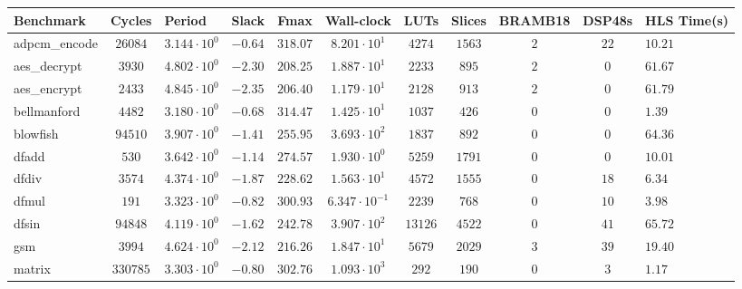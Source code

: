 \begin{tabular}{|l|c|HHc|c|c|c|c|cH|}
\hline
Benchmark     & Cycles       & Period                 & Slack     & Fmax       & Wall-clock              & LUTs      & Slices    & BRAMB18 & DSP48s  & HLS Time(s) \\
\hline
adpcm\_encode & $ 26084    $ & $ 3.144 \cdot 10^{0} $ & $ -0.64 $ & $ 318.07 $ & $ 8.201 \cdot 10^{1}  $ & $ 4274  $ & $ 1563  $ & $ 2   $ & $ 22  $ & $ 10.21   $ \\
aes\_decrypt  & $ 3930     $ & $ 4.802 \cdot 10^{0} $ & $ -2.30 $ & $ 208.25 $ & $ 1.887 \cdot 10^{1}  $ & $ 2233  $ & $ 895   $ & $ 2   $ & $ 0   $ & $ 61.67   $ \\
aes\_encrypt  & $ 2433     $ & $ 4.845 \cdot 10^{0} $ & $ -2.35 $ & $ 206.40 $ & $ 1.179 \cdot 10^{1}  $ & $ 2128  $ & $ 913   $ & $ 2   $ & $ 0   $ & $ 61.79   $ \\
bellmanford   & $ 4482     $ & $ 3.180 \cdot 10^{0} $ & $ -0.68 $ & $ 314.47 $ & $ 1.425 \cdot 10^{1}  $ & $ 1037  $ & $ 426   $ & $ 0   $ & $ 0   $ & $ 1.39    $ \\
blowfish      & $ 94510    $ & $ 3.907 \cdot 10^{0} $ & $ -1.41 $ & $ 255.95 $ & $ 3.693 \cdot 10^{2}  $ & $ 1837  $ & $ 892   $ & $ 0   $ & $ 0   $ & $ 64.36   $ \\
dfadd         & $ 530      $ & $ 3.642 \cdot 10^{0} $ & $ -1.14 $ & $ 274.57 $ & $ 1.930 \cdot 10^{0}  $ & $ 5259  $ & $ 1791  $ & $ 0   $ & $ 0   $ & $ 10.01   $ \\
dfdiv         & $ 3574     $ & $ 4.374 \cdot 10^{0} $ & $ -1.87 $ & $ 228.62 $ & $ 1.563 \cdot 10^{1}  $ & $ 4572  $ & $ 1555  $ & $ 0   $ & $ 18  $ & $ 6.34    $ \\
dfmul         & $ 191      $ & $ 3.323 \cdot 10^{0} $ & $ -0.82 $ & $ 300.93 $ & $ 6.347 \cdot 10^{-1} $ & $ 2239  $ & $ 768   $ & $ 0   $ & $ 10  $ & $ 3.98    $ \\
dfsin         & $ 94848    $ & $ 4.119 \cdot 10^{0} $ & $ -1.62 $ & $ 242.78 $ & $ 3.907 \cdot 10^{2}  $ & $ 13126 $ & $ 4522  $ & $ 0   $ & $ 41  $ & $ 65.72   $ \\
gsm           & $ 3994     $ & $ 4.624 \cdot 10^{0} $ & $ -2.12 $ & $ 216.26 $ & $ 1.847 \cdot 10^{1}  $ & $ 5679  $ & $ 2029  $ & $ 3   $ & $ 39  $ & $ 19.40   $ \\
matrix        & $ 330785   $ & $ 3.303 \cdot 10^{0} $ & $ -0.80 $ & $ 302.76 $ & $ 1.093 \cdot 10^{3}  $ & $ 292   $ & $ 190   $ & $ 0   $ & $ 3   $ & $ 1.17    $ \\

\end{tabular}
